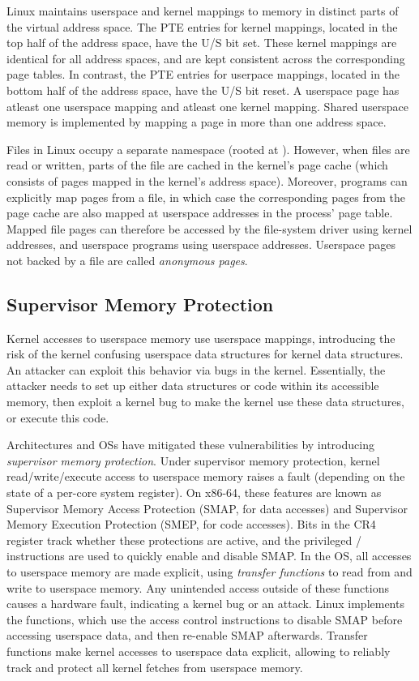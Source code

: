Linux maintains userspace and kernel mappings to memory in distinct
parts of the virtual address space.
The PTE entries for kernel mappings, located in the top half of the
address space, have the U/S bit set.
These kernel mappings are identical for all address spaces, and are
kept consistent across the corresponding page tables.
In contrast, the PTE entries for userpace mappings, located in the 
bottom half of the address space, have the U/S bit reset.
A userspace page has atleast one userspace mapping and atleast one
kernel mapping.
Shared userspace memory is implemented by mapping a page in more than
one address space.

Files in Linux occupy a separate namespace (rooted at \Code{/}).
However, when files are read or written, parts of the file are cached
in the kernel's page cache (which consists of pages mapped in the kernel's
address space).
Moreover, programs can explicitly map pages from a file, in which case
the corresponding pages from the page cache are also mapped at userspace
addresses in the process' page table.
Mapped file pages can therefore be accessed by the file-system driver using
kernel addresses, and userspace programs using userspace addresses.
Userspace pages not backed by a file are called \emph{anonymous pages}.


\subsection{Supervisor Memory Protection} %

Kernel accesses to userspace memory use userspace mappings, introducing
the risk of the kernel confusing userspace data structures
for kernel data structures.
An attacker can exploit this behavior via bugs in the
kernel.
Essentially, the attacker needs to set up either data structures
or code within its accessible memory, then exploit a kernel
bug to make the kernel use these data structures, or execute
this code.

Architectures and OSs have mitigated these vulnerabilities
by introducing \emph{supervisor memory protection}.
Under supervisor memory protection, kernel read/write/execute access to userspace memory
raises a fault (depending on the state of a per-core system
register).
On x86-64, these features are known as Supervisor Memory Access
Protection (SMAP, for data accesses) and Supervisor Memory Execution
Protection (SMEP, for code accesses). 
Bits in the CR4 register track whether these protections are active, 
and the privileged / instructions are used to 
quickly enable and disable SMAP.
In the OS, all accesses to userspace memory are made explicit,
using \emph{transfer functions} to read from and write to userspace memory.
Any unintended access outside of these functions causes a
hardware fault, indicating a kernel bug or an attack.
Linux implements the  functions, which
use the access control instructions to disable SMAP before
accessing userspace data, and then re-enable SMAP afterwards.  
Transfer functions make
kernel accesses to userspace data explicit, allowing
\midas to reliably track and protect all kernel fetches from userspace memory.


